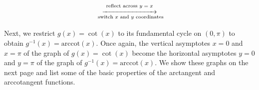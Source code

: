 \documentclass[12pt]{ximera}
\begin{document}
\[ \begin{array}{ccc}



&

\stackrel{\stackrel{\mbox{\scriptsize reflect across $y=x$}}{\xrightarrow{\hspace{1in}}}}{\mbox{ \scriptsize switch $x$ and $y$ coordinates}} 

&



\end{array}\]

Next, we restrict $g(x) = \cot(x)$ to its fundamental cycle on $(0,\pi)$ to obtain $g^{-1}(x) = \mbox{arccot}(x)$.  Once again, the vertical asymptotes $x=0$ and $x=\pi$ of the graph of $g(x) = \cot(x)$ become the horizontal asymptotes $y = 0$ and $y = \pi$ of the graph of $g^{-1}(x) = \mbox{arccot}(x)$.  We show these graphs on the next page and list some of the basic properties of the arctangent and arccotangent functions.
\end{document}
